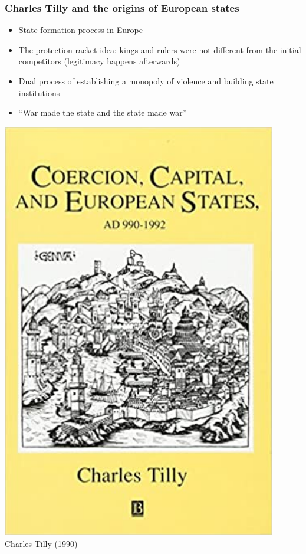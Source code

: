 \documentclass[utf8, xcolor=dvipsnames, handout]{beamer}
\begin{document}
\begin{frame}
\frametitle{Charles Tilly and the origins of European states}
\centering

\begin{minipage}{0.66\textwidth}\centering
\begin{itemize}[<+->]
\item State-formation process in Europe
\item The protection racket idea: kings and rulers were not different from the initial competitors (legitimacy happens afterwards)
\item Dual process of establishing a monopoly of violence and building state institutions
\item ``War made the state and the state made war''
\end{itemize}
\end{minipage}\hfill
\begin{minipage}{0.33\textwidth}\centering
\includegraphics[width = 0.9\textwidth]{img/tilly_book}\\\vspace{5pt}
{\small Charles Tilly (1990)}
\end{minipage}

\end{frame}
\end{document}

